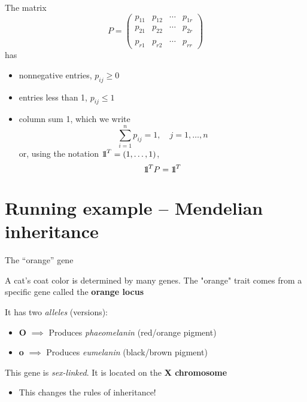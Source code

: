 \documentclass[aspectratio=169]{beamer}\usepackage[]{graphicx}\usepackage[]{xcolor}
\begin{document}
\begin{frame} 
The matrix 
\[
P=
\begin{pmatrix}
p_{11} & p_{12} & \cdots & p_{1r} \\
p_{21} & p_{22} & \cdots & p_{2r} \\
&&& \\
p_{r1} & p_{r2} & \cdots & p_{rr}
\end{pmatrix}
\]
has
\begin{itemize}
\item nonnegative entries, $p_{ij}\geq 0$
\item entries less than 1, $p_{ij}\leq 1$
\item column sum 1, which we write
\[
\sum_{i=1}^n p_{ij}=1,\quad j=1,\ldots,n
\]
or, using the notation $\nbOne^T=(1,\ldots,1)$,
\[
\nbOne^TP=\nbOne^T
\]
\end{itemize}
\end{frame}


\section{Running example -- Mendelian inheritance}


\begin{frame}{The ``orange'' gene}
    
    A cat's coat color is determined by many genes. The "orange" trait comes from a specific gene called the \textbf{orange locus}
    
    \vfill
    
    It has two \emph{alleles} (versions):
    \begin{itemize}
        \item \textbf{O} $\implies$ Produces \emph{phaeomelanin} (red/orange pigment)
        \item \textbf{o} $\implies$ Produces \emph{eumelanin} (black/brown pigment)
    \end{itemize}
    
    \vfill
    
    This gene is \emph{sex-linked}. It is located on the \textbf{X chromosome}
    \begin{itemize}
        \item This changes the rules of inheritance!
    \end{itemize}
    
\end{frame}
\end{document}
